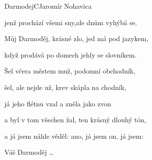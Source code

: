 \begin{song}{Darmodej}{C}{Jaromír Nohavica}
\begin{SBChorus}
jenž prochází všemi sny,ale dnům vyhýbá se.

Můj Darmoděj, krásné zlo, jed má pod jazykem,

když prodává po domech jehly se slovníkem.

\end{SBChorus}
\begin{SBVerse}
Šel včera městem muž, podomní obchodník,

šel, ale nejde už, krev skápla na chodník,

já jeho flétnu vzal a zněla jako zvon

a byl v tom všechen žal, ten krásný dlouhý tón,

a já jsem náhle věděl: ano, já jsem on, já jsem:

  \end{SBVerse}
  
\begin{SBChorus}
Váš Darmoděj \dots
\end{SBChorus}
 \end{song}
